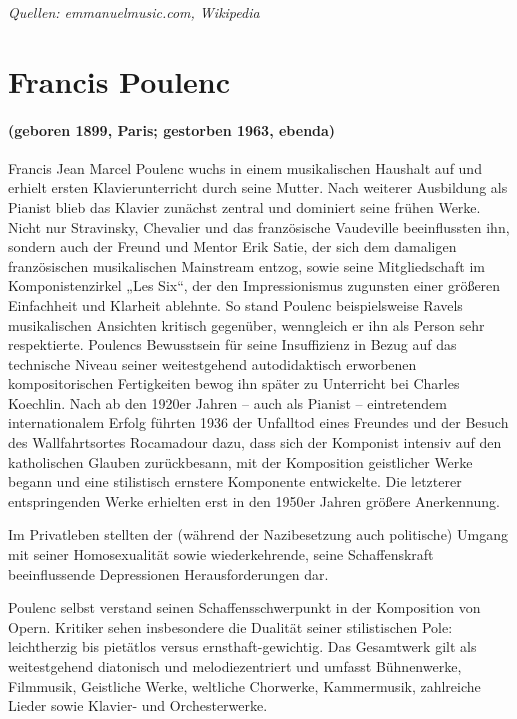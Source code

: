 \documentclass[11pt, ngermanm, titlepage]{article}
\begin{document}
\begin{multicols}{2}
	\textit{Quellen: emmanuelmusic.com,	Wikipedia}
	
	
	\section*{Francis Poulenc}
	\paragraph{(geboren 1899, Paris; gestorben 1963, ebenda)\newline}
	Francis Jean Marcel Poulenc wuchs in einem musikalischen Haushalt auf und erhielt ersten Klavierunterricht durch seine Mutter. Nach weiterer Ausbildung als Pianist blieb das Klavier zunächst zentral und dominiert seine frühen Werke. Nicht nur Stravinsky, Chevalier und das französische Vaudeville beeinflussten ihn, sondern auch der Freund und Mentor Erik Satie, der sich dem damaligen französischen musikalischen Mainstream entzog, sowie seine Mitgliedschaft im Komponistenzirkel „Les Six“, der den Impressionismus zugunsten einer größeren Einfachheit und Klarheit ablehnte. So stand Poulenc beispielsweise Ravels musikalischen Ansichten kritisch gegenüber, wenngleich er ihn als Person sehr respektierte. Poulencs Bewusstsein für seine Insuffizienz in Bezug auf das technische Niveau seiner weitestgehend autodidaktisch erworbenen kompositorischen Fertigkeiten bewog ihn später zu Unterricht bei Charles Koechlin. Nach ab den 1920er Jahren – auch als Pianist – eintretendem internationalem Erfolg führten 1936 der Unfalltod eines Freundes und der Besuch des Wallfahrtsortes Rocamadour dazu, dass sich der Komponist intensiv auf den katholischen Glauben zurückbesann, mit der Komposition geistlicher Werke begann und eine stilistisch ernstere Komponente entwickelte. Die letzterer entspringenden Werke erhielten erst in den 1950er Jahren größere Anerkennung.
	
	Im Privatleben stellten der (während der Nazibesetzung auch politische) Umgang mit seiner Homosexualität sowie wiederkehrende, seine Schaffenskraft beeinflussende Depressionen Herausforderungen dar.
	
	Poulenc selbst verstand seinen Schaffensschwerpunkt in der Komposition von Opern. Kritiker sehen insbesondere die Dualität seiner stilistischen Pole: leichtherzig bis pietätlos versus ernsthaft-gewichtig. Das Gesamtwerk gilt als weitestgehend diatonisch und melodiezentriert und umfasst Bühnenwerke, Filmmusik, Geistliche Werke, weltliche Chorwerke, Kammermusik, zahlreiche Lieder sowie Klavier- und Orchesterwerke.
	

\end{multicols}
\end{document}

